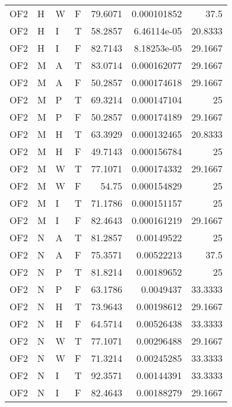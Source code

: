 \begin{table}[!htb]
{\begin{tabular}{llllrrr}
            OF2      & H     & W     & F          & 79.6071    & 0.000101852 & 37.5     \\
            OF2      & H     & I     & T          & 58.2857    & 6.46114e-05 & 20.8333  \\
            OF2      & H     & I     & F          & 82.7143    & 8.18253e-05 & 29.1667  \\
            OF2      & M     & A     & T          & 83.0714    & 0.000162077 & 29.1667  \\
            OF2      & M     & A     & F          & 50.2857    & 0.000174618 & 29.1667  \\
            OF2      & M     & P     & T          & 69.3214    & 0.000147104 & 25       \\
            OF2      & M     & P     & F          & 50.2857    & 0.000174189 & 29.1667  \\
            OF2      & M     & H     & T          & 63.3929    & 0.000132465 & 20.8333  \\
            OF2      & M     & H     & F          & 49.7143    & 0.000156784 & 25       \\
            OF2      & M     & W     & T          & 77.1071    & 0.000174332 & 29.1667  \\
            OF2      & M     & W     & F          & 54.75      & 0.000154829 & 25       \\
            OF2      & M     & I     & T          & 71.1786    & 0.000151157 & 25       \\
            OF2      & M     & I     & F          & 82.4643    & 0.000161219 & 29.1667  \\
            OF2      & N     & A     & T          & 81.2857    & 0.00149522  & 25       \\
            OF2      & N     & A     & F          & 75.3571    & 0.00522213  & 37.5     \\
            OF2      & N     & P     & T          & 81.8214    & 0.00189652  & 25       \\
            OF2      & N     & P     & F          & 63.1786    & 0.0049437   & 33.3333  \\
            OF2      & N     & H     & T          & 73.9643    & 0.00198612  & 29.1667  \\
            OF2      & N     & H     & F          & 64.5714    & 0.00526438  & 33.3333  \\
            OF2      & N     & W     & T          & 77.1071    & 0.00296488  & 29.1667  \\
            OF2      & N     & W     & F          & 71.3214    & 0.00245285  & 33.3333  \\
            OF2      & N     & I     & T          & 92.3571    & 0.00144391  & 33.3333  \\
            OF2      & N     & I     & F          & 82.4643    & 0.00188279  & 29.1667  \\
            \hline
        \end{tabular}
    }{}
\end{table}